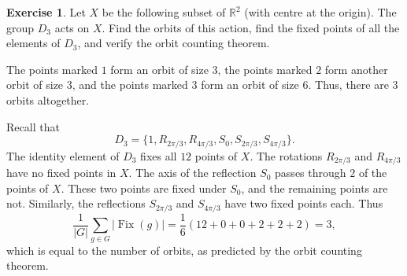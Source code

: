 \documentclass{amsart}
\DeclareMathOperator{\Fix}{Fix}
\renewcommand{\:}{\colon}
\newcommand{\R}{\mathbb{R}}
\theoremstyle{definition}
\newtheorem{exercise}{Exercise}
\newenvironment{solution}{{\noindent\bf Solution:}}{}
\begin{document}
\begin{exercise}
 Let $X$ be the following subset of $\R^2$ (with centre at the
 origin).  The group $D_3$ acts on $X$.  Find the orbits of this
 action, find the fixed points of all the elements of $D_3$, and
 verify the orbit counting theorem.
 \begin{center}
 \end{center}
\end{exercise}
\begin{solution}
 The points marked $1$ form an orbit of size $3$, the points marked
 $2$ form another orbit of size $3$, and the points marked $3$ form an
 orbit of size $6$.  Thus, there are $3$ orbits altogether.
 \begin{center}
 \end{center}
 Recall that 
 \[ D_3=\{1,R_{2\pi/3},R_{4\pi/3},S_0,S_{2\pi/3},S_{4\pi/3}\}. \]
 The identity element of $D_3$ fixes all $12$ points of $X$.  The
 rotations $R_{2\pi/3}$ and $R_{4\pi/3}$ have no fixed points in $X$.
 The axis of the reflection $S_0$ passes through $2$ of the points of
 $X$.  These two points are fixed under $S_0$, and the remaining
 points are not.  Similarly, the reflections $S_{2\pi/3}$ and
 $S_{4\pi/3}$ have two fixed points each.  Thus
 \[ \frac{1}{|G|}\sum_{g\in G}|\Fix(g)| = 
     \frac{1}{6}(12+0+0+2+2+2) = 3, 
 \]
 which is equal to the number of orbits, as predicted by the
 orbit counting theorem.
\end{solution}
\end{document}
